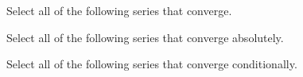 \documentclass{ximera}
\author{Jim Talamo}
\begin{document}
\begin{exercise}

Select all of the following series that converge.

\begin{selectAll}
\end{selectAll}

Select all of the following series that converge absolutely.

\begin{selectAll}
\end{selectAll}

Select all of the following series that converge conditionally.

\begin{selectAll}
\end{selectAll}
\end{exercise}
\end{document}
